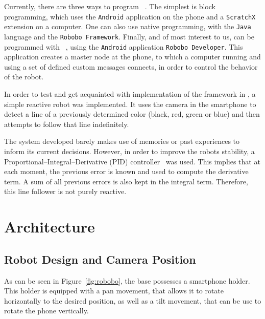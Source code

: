 \documentclass[10pt,conference,compsoc]{IEEEtran}
\begin{document}
Currently, there are three ways to program \robobo~\cite{Robobo_Programming}. The simplest is block programming, which uses the \robobo \texttt{Android} application on the phone and a \texttt{ScratchX}~\cite{Scratch} extension on a computer. One can also use native programming, with the \texttt{Java} language and the \texttt{Robobo Framework}. Finally, and of most interest to us, \robobo can be programmed with \ros~\cite{ROS,AGITR}, using the \texttt{Android} application \texttt{Robobo Developer}. This application creates a \ros master node at the phone, to which a computer running \ros and using a set of defined custom messages connects, in order to control the behavior of the robot.

In order to test and get acquainted with implementation of the \ros framework in \robobo, a simple reactive robot was implemented. It uses the camera in the smartphone to detect a line of a previously determined color (black, red, green or blue) and then attempts to follow that line indefinitely. 

The system developed barely makes use of memories or past experiences to inform its current decisions. However, in order to improve the robots stability, a Proportional–Integral–Derivative (PID) controller~\cite{PID_wiki,PID_line_follower} was used. This implies that at each moment, the previous error is known and used to compute the derivative term. A sum of all previous errors is also kept in the integral term. Therefore, this \robobo line follower is not purely reactive.

\section{Architecture}
\subsection{Robot Design and Camera Position}

As can be seen in Figure~\ref{fig:robobo}, the \robobo base possesses a smartphone holder. This holder is equipped with a pan movement, that allows it to rotate horizontally to the desired position, as well as a tilt movement, that can be use to rotate the phone vertically. 
\end{document}
